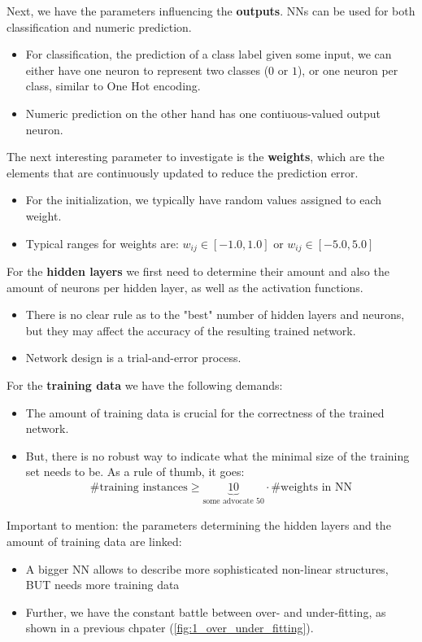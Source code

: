 Next, we have the parameters influencing the \textbf{outputs}. NNs can be used for both classification and numeric prediction.
\begin{itemize}
  \item For classification, the prediction of a class label given some input, we can either have one neuron to represent two classes ($0$ or $1$), or one neuron per class, similar to One Hot encoding.
  \item Numeric prediction on the other hand has one contiuous-valued output neuron.
\end{itemize}

The next interesting parameter to investigate is the \textbf{weights}, which are the elements that are continuously updated to reduce the prediction error.
\begin{itemize}
  \item For the initialization, we typically have random values assigned to each weight.
  \item Typical ranges for weights are: $w_{ij}\in[-1.0, 1.0]$ or $w_{ij}\in[-5.0, 5.0]$
\end{itemize}

For the \textbf{hidden layers} we first need to determine their amount and also the amount of neurons per hidden layer, as well as the activation functions.
\begin{itemize}
  \item There is no clear rule as to the "best" number of hidden layers and neurons, but they may affect the accuracy of the resulting trained network.
  \item Network design is a trial-and-error process.
\end{itemize}

For the \textbf{training data} we have the following demands:
\begin{itemize}
  \item The amount of training data is crucial for the correctness of the trained network.
  \item But, there is no robust way to indicate what the minimal size of the training set needs to be. As a rule of thumb, it goes:
  \begin{align*}
    \text{\# training instances} \geq \underbrace{10}_{\text{some advocate 50}} \cdot \text{\# weights in NN}
  \end{align*}
\end{itemize}

Important to mention: the parameters determining the hidden layers and the amount of training data are linked:
\begin{itemize}
  \item A bigger NN allows to describe more sophisticated non-linear structures, BUT needs more training data
  \item Further, we have the constant battle between over- and under-fitting, as shown in a previous chpater (\ref{fig:1_over_under_fitting}).
\end{itemize}
